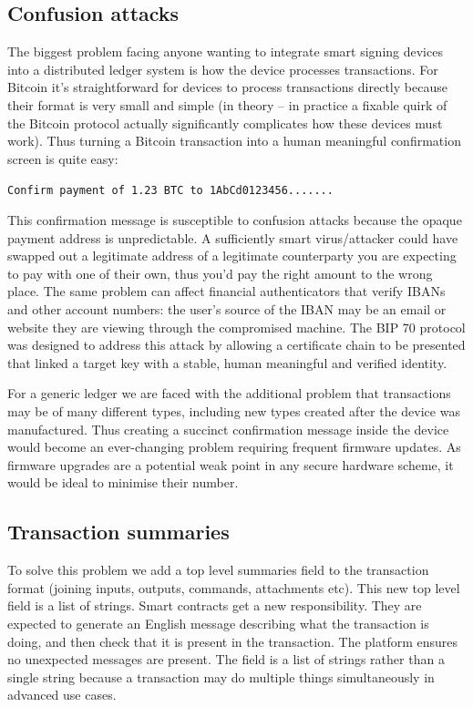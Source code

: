 \documentclass{article}
\begin{document}
\subsection{Confusion attacks}

The biggest problem facing anyone wanting to integrate smart signing devices into a distributed ledger system is how the
device processes transactions. For Bitcoin it's straightforward for devices to process transactions directly because
their format is very small and simple (in theory -- in practice a fixable quirk of the Bitcoin protocol actually
significantly complicates how these devices must work). Thus turning a Bitcoin transaction into a human meaningful
confirmation screen is quite easy:

\indent\texttt{Confirm payment of 1.23 BTC to 1AbCd0123456.......}

This confirmation message is susceptible to confusion attacks because the opaque payment address is unpredictable. A
sufficiently smart virus/attacker could have swapped out a legitimate address of a legitimate counterparty you are
expecting to pay with one of their own, thus you'd pay the right amount to the wrong place. The same problem can affect
financial authenticators that verify IBANs and other account numbers: the user's source of the IBAN may be an email or
website they are viewing through the compromised machine. The BIP 70\cite{BIP70} protocol was designed to address this
attack by allowing a certificate chain to be presented that linked a target key with a stable, human meaningful and
verified identity.

For a generic ledger we are faced with the additional problem that transactions may be of many different types,
including new types created after the device was manufactured. Thus creating a succinct confirmation message inside the
device would become an ever-changing problem requiring frequent firmware updates. As firmware upgrades are a potential
weak point in any secure hardware scheme, it would be ideal to minimise their number.

\subsection{Transaction summaries}

To solve this problem we add a top level summaries field to the transaction format (joining inputs, outputs, commands,
attachments etc). This new top level field is a list of strings. Smart contracts get a new responsibility. They are
expected to generate an English message describing what the transaction is doing, and then check that it is present in
the transaction. The platform ensures no unexpected messages are present. The field is a list of strings rather than
a single string because a transaction may do multiple things simultaneously in advanced use cases.
\end{document}
